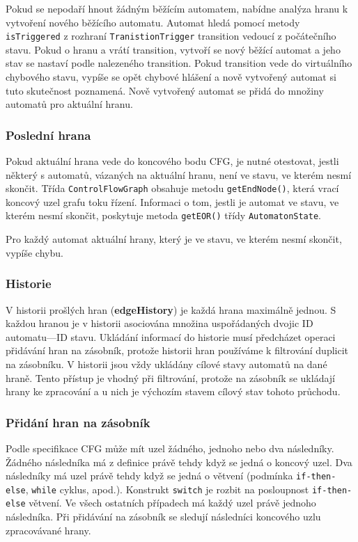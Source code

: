\documentclass[11pt,final,oneside]{fithesis}
\begin{document}
Pokud se nepodaří hnout žádným běžícím automatem, nabídne analýza hranu k vytvoření nového běžícího automatu. Automat hledá pomocí metody \texttt{isTriggered} z rozhraní \texttt{TranistionTrigger} transition vedoucí z počátečního stavu. Pokud o hranu  a vrátí transition, vytvoří se nový běžící automat a jeho stav se nastaví podle nalezeného transition. Pokud transition vede do virtuálního chybového stavu, vypíše se opět chybové hlášení a nově vytvořený automat si tuto skutečnost poznamená. Nově vytvořený automat se přidá do množiny automatů pro aktuální hranu.

\subsubsection{Poslední hrana}
Pokud aktuální hrana vede do koncového bodu CFG, je nutné otestovat, jestli některý s automatů, vázaných na aktuální hranu, není ve stavu, ve kterém nesmí skončit. Třída \texttt{ControlFlowGraph} obsahuje metodu \texttt{getEndNode()}, která vrací koncový uzel grafu toku řízení. Informaci o tom, jestli je automat ve stavu, ve kterém nesmí skončit, poskytuje metoda \texttt{getEOR()} třídy \texttt{AutomatonState}.
 
Pro každý automat aktuální hrany, který je ve stavu, ve kterém nesmí skončit, vypíše chybu. 

\subsubsection{Historie}
V historii prošlých hran (\textbf{edgeHistory}) je každá hrana maximálně jednou. S každou hranou je v historii asociována množina uspořádaných dvojic ID automatu---ID stavu. Ukládání informací do historie musí předcházet operaci přidávání hran na zásobník, protože historii hran používáme k filtrování duplicit na zásobníku. V historii jsou vždy ukládány cílové stavy automatů na dané hraně. Tento přístup je vhodný při filtrování, protože na zásobník se ukládají hrany ke zpracování a u nich je výchozím stavem cílový stav tohoto průchodu.

\subsubsection{Přidání hran na zásobník}
Podle specifikace CFG může mít uzel žádného, jednoho nebo dva následníky. Žádného následníka má z definice\cite{jarek} právě tehdy když se jedná o koncový uzel. Dva následníky má uzel právě tehdy když se jedná o větvení (podmínka {\tt if-then-else}, {\tt while} cyklus, apod.). Konstrukt {\tt switch} je rozbit na posloupnost {\tt if-then-else} větvení. Ve všech ostatních případech má každý uzel právě jednoho následníka. Při přidávání na zásobník se sledují následníci koncového uzlu zpracovávané hrany.
\end{document}
